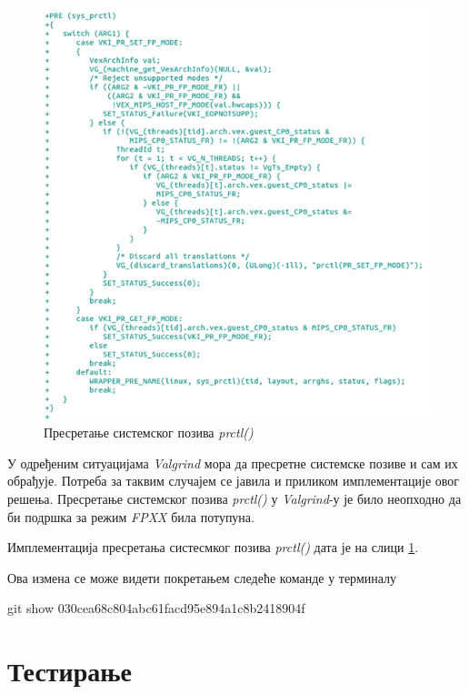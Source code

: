 \documentclass[12pt,oneside]{memoir}
\begin{document}
\begin{figure}[h!]
\begin{center}
\includegraphics[scale=0.75]{slika28.png}
\end{center}
\caption{Пресретање системског позива \textit{prctl()}}
\label{fig:prctl}
\end{figure}

\indent У одређеним ситуацијама \textit{Valgrind} мора да пресретне системске позиве и сам их обрађује. Потреба за таквим случајем се јавила и приликом имплементације овог решења. Пресретање системског позива \textit{prctl()} у \textit{Valgrind}-у је било неопходно да би подршка за режим \textit{FPXX} била потупуна.

Имплементација пресретања систесмког позива \textit{prctl()} дата је на слици \ref{fig:prctl}.

Ова измена се може видети покретањем следеће команде у терминалу

\begin{center}
git show 030cea68c804abc61facd95e894a1c8b2418904f
\end{center}

\section{Тестирање}
\end{document}
